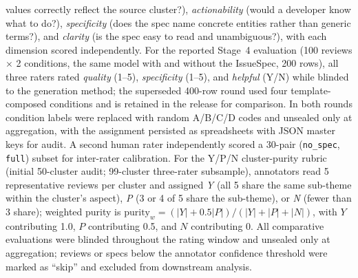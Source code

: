 \documentclass[preprint,12pt]{elsarticle}
\begin{document}
  values correctly reflect the source cluster?), \emph{actionability} (would a developer know
  what to do?), \emph{specificity} (does the spec name concrete entities rather than generic
  terms?), and \emph{clarity} (is the spec easy to read and unambiguous?), with each dimension
  scored independently. For the reported Stage~4 evaluation (100 reviews $\times$ 2 conditions,
  the same model with and without the IssueSpec, 200 rows), all three raters rated
  \emph{quality} (1--5), \emph{specificity} (1--5), and \emph{helpful} (Y/N) while blinded to
  the generation method; the superseded 400-row round used four template-composed conditions and
  is retained in the release for comparison. In both rounds condition labels were replaced with random A/B/C/D codes and unsealed
  only at aggregation, with the assignment persisted as spreadsheets with JSON master keys for
  audit. A second human rater independently scored a 30-pair (\texttt{no\_spec}, \texttt{full})
  subset for inter-rater calibration. For the Y/P/N cluster-purity rubric (initial 50-cluster
  audit; 99-cluster three-rater subsample), annotators read 5 representative reviews per cluster
   and assigned \emph{Y} (all 5 share the same sub-theme within the cluster's aspect), \emph{P}
  (3 or 4 of 5 share the sub-theme), or \emph{N} (fewer than 3 share); weighted purity is
  $\mathrm{purity}_w = (|Y| + 0.5|P|)/(|Y|+|P|+|N|)$, with $Y$ contributing 1.0, $P$
  contributing 0.5, and $N$ contributing 0. All comparative evaluations were blinded throughout
  the rating window and unsealed only at aggregation; reviews or specs below the annotator
  confidence threshold were marked as ``skip'' and excluded from downstream analysis.
\end{document}

